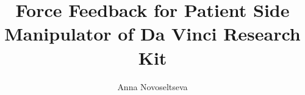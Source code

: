 \documentclass[12pt,letterpaper, oneside,final]{template/thesisClass}
\begin{document}
\title{Force Feedback for Patient Side Manipulator of Da Vinci Research Kit}
\author{Anna Novoseltseva}
\copyrightnotice







\begin{spacing}{1}
\def\dsp{\def\baselinestretch{1.25}\large\normalsize}


\end{spacing}
\end{document}
